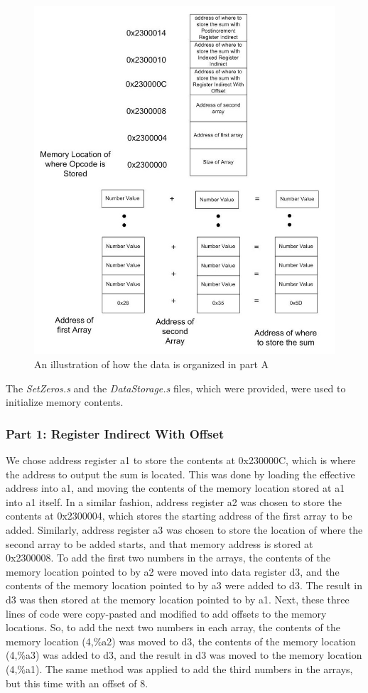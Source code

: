 \documentclass[letterpaper]{article}
\begin{document}
    \begin{figure}[h!]
      \centering
      \includegraphics[width=.6\textwidth]{mema.jpg}
      \caption{An illustration of how the data is organized in part A}
    \end{figure}

    \noindent The \textit{SetZeros.s} and the \textit{DataStorage.s}
    files, which were provided, were used to initialize memory contents.

    \subsubsection{Part 1: Register Indirect With Offset}
    We chose address register a1 to store the contents at 0x230000C, which is
    where the address to output the sum is located. This was done by loading the
    effective address into a1, and moving the contents of the memory location
    stored at a1 into a1 itself. In a similar fashion, address register a2 was
    chosen to store the contents at 0x2300004, which stores the starting address
    of the first array to be added. Similarly, address register a3 was chosen to
    store the location of where the second array to be added starts, and that
    memory address is stored at 0x2300008. To add the first two numbers in the
    arrays, the contents of the memory location pointed to by a2 were moved into
    data register d3, and the contents of the memory location pointed to by a3
    were added to d3. The result in d3 was then stored at the memory location
    pointed to by a1. Next, these three lines of code were copy-pasted and
    modified to add offsets to the memory locations.  So, to add the next two
    numbers in each array, the contents of the memory location (4,\%a2) was
    moved to d3, the contents of the memory location (4,\%a3) was added to d3,
    and the result in d3 was moved to the memory location (4,\%a1). The same
    method was applied to add the third numbers in the arrays, but this time
    with an offset of 8.
\end{document}
